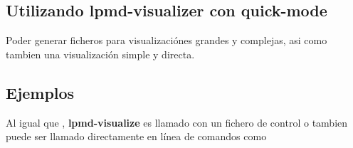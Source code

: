 \subsection{Utilizando lpmd-visualizer con quick-mode}
Poder generar ficheros para visualizaci\'ones grandes y complejas, asi como tambien una visualizaci\'on simple y directa.

\subsection{Ejemplos}

Al igual que {\lpmd}, \textbf{lpmd-visualize} es llamado con un fichero de control o tambien puede ser llamado directamente en l\'inea de comandos como

% 
% 
